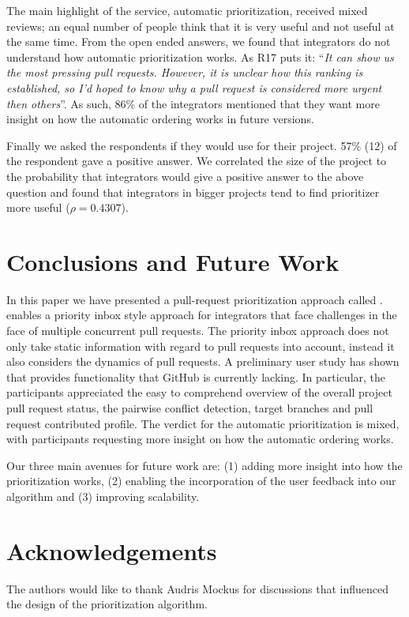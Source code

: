 \documentclass[conference]{IEEEtran}
\begin{document}
The main highlight of the service, automatic prioritization, received mixed
reviews; an equal number of people think that it is very useful and not useful at
the same time. From the open ended answers, we found that integrators do not
understand how automatic prioritization works. As
R17 puts it: ``\emph{It can show us the most pressing pull requests. However, it is unclear how this ranking is established, so I'd hoped to know why a pull request is considered more urgent then others}''. As such, 86\%
of the integrators mentioned that they want more insight on how the automatic ordering works in future versions.

Finally we asked the respondents if they would use \prioritizer for their project. 57\% (12) of the respondent gave a positive answer.
We correlated the size of the project to the probability that integrators would
give a positive answer to the above question and found that integrators in
bigger projects tend to find prioritizer more useful
($\rho = 0.4307$).


\section{Conclusions and Future Work}
In this paper we have presented a pull-request prioritization approach called \prioritizer . \prioritizer enables a priority inbox style approach for integrators that face challenges in the face of multiple concurrent pull requests. The priority inbox approach does not only take static information with regard to pull requests into account, instead it also considers the dynamics of pull requests.   
%
A preliminary user study has shown that \prioritizer provides functionality that GitHub is currently lacking. In particular, the participants appreciated the easy to comprehend overview of the overall project pull request status, the pairwise conflict detection, target branches and pull request contributed profile. The verdict for the automatic prioritization is mixed, with participants requesting more insight on how the automatic ordering works. 

Our three main avenues for future work are: (1) adding more insight into how the prioritization works, (2) enabling the incorporation of the user feedback into our algorithm and (3) improving scalability.




\section*{Acknowledgements} The authors would like to thank Audris Mockus for discussions that influenced the design of the prioritization algorithm.



\end{document}
